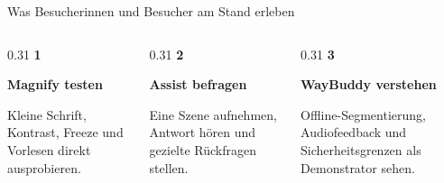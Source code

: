 \begin{PosterBlock}{Was Besucherinnen und Besucher am Stand erleben}
\begin{columns}[t,totalwidth=\linewidth]
  \begin{column}{0.31\linewidth}
    \centering
    {\Huge\bfseries\color{PosterPrimary}1}\par\vspace{2mm}
    {\LARGE\bfseries Magnify testen}\par\vspace{2mm}
    {\Large Kleine Schrift, Kontrast, Freeze und Vorlesen direkt ausprobieren.}
  \end{column}
  \begin{column}{0.31\linewidth}
    \centering
    {\Huge\bfseries\color{PosterPrimary}2}\par\vspace{2mm}
    {\LARGE\bfseries Assist befragen}\par\vspace{2mm}
    {\Large Eine Szene aufnehmen, Antwort hören und gezielte Rückfragen stellen.}
  \end{column}
  \begin{column}{0.31\linewidth}
    \centering
    {\Huge\bfseries\color{PosterPrimary}3}\par\vspace{2mm}
    {\LARGE\bfseries WayBuddy verstehen}\par\vspace{2mm}
    {\Large Offline-Segmentierung, Audiofeedback und Sicherheitsgrenzen als Demonstrator sehen.}
  \end{column}
\end{columns}

\vspace{7mm}
\centering
{}\hspace{2mm}\hspace{2mm}
\end{PosterBlock}
